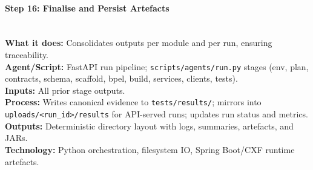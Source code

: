 \documentclass[11pt,a4paper]{article}
\begin{document}
\paragraph{Step 16: Finalise and Persist Artefacts} \hfill\\
\textbf{What it does:} Consolidates outputs per module and per run, ensuring traceability.\\
\textbf{Agent/Script:} FastAPI run pipeline; \texttt{scripts/agents/run.py} stages (env, plan, contracts, schema, scaffold, bpel, build, services, clients, tests).\\
\textbf{Inputs:} All prior stage outputs.\\
\textbf{Process:} Writes canonical evidence to \texttt{tests/results/}; mirrors into \texttt{uploads/\textless run\_id\textgreater{}/results} for API-served runs; updates run status and metrics.\\
\textbf{Outputs:} Deterministic directory layout with logs, summaries, artefacts, and JARs.\\
\textbf{Technology:} Python orchestration, filesystem IO, Spring Boot/CXF runtime artefacts.
\end{document}
